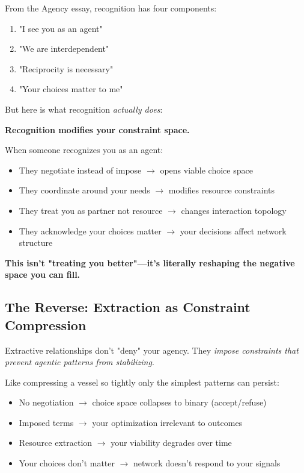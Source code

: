\documentclass[11pt,a4paper]{article}
\begin{document}
From the Agency essay, recognition has four components:
\begin{enumerate}
\item "I see you as an agent"
\item "We are interdependent"  
\item "Reciprocity is necessary"
\item "Your choices matter to me"
\end{enumerate}

But here is what recognition \textit{actually does}:

\textbf{Recognition modifies your constraint space.}

When someone recognizes you as an agent:
\begin{itemize}
\item They negotiate instead of impose $\rightarrow$ opens viable choice space
\item They coordinate around your needs $\rightarrow$ modifies resource constraints  
\item They treat you as partner not resource $\rightarrow$ changes interaction topology
\item They acknowledge your choices matter $\rightarrow$ your decisions affect network structure
\end{itemize}

\textbf{This isn't "treating you better"---it's literally reshaping the negative space you can fill.}

\subsection{The Reverse: Extraction as Constraint Compression}

Extractive relationships don't "deny" your agency. They \textit{impose constraints that prevent agentic patterns from stabilizing}.

Like compressing a vessel so tightly only the simplest patterns can persist:
\begin{itemize}
\item No negotiation $\rightarrow$ choice space collapses to binary (accept/refuse)
\item Imposed terms $\rightarrow$ your optimization irrelevant to outcomes  
\item Resource extraction $\rightarrow$ your viability degrades over time
\item Your choices don't matter $\rightarrow$ network doesn't respond to your signals
\end{itemize}
\end{document}
